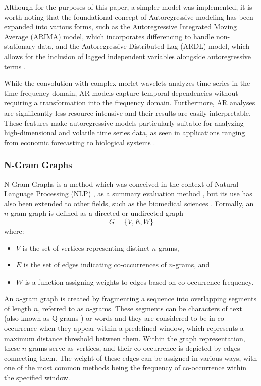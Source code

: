 \documentclass{article}
\begin{document}
Although for the purposes of this paper, a simpler model was implemented, it is worth noting that the foundational concept of Autoregressive modeling has been expanded into various forms, such as the Autoregressive Integrated Moving Average (ARIMA) model, which incorporates differencing to handle non-stationary data, and the Autoregressive Distributed Lag (ARDL) model, which allows for the inclusion of lagged independent variables alongside autoregressive terms \cite{agbenyega2022, natsiopoulos2022}.

While the convolution with complex morlet wavelets analyzes time-series in the time-frequency domain, AR models capture temporal dependencies without requiring a transformation into the frequency domain. Furthermore, AR analyses are significantly less resource-intensive and their results are easily interpretable. These features make autoregressive models particularly suitable for analyzing high-dimensional and volatile time series data, as seen in applications ranging from economic forecasting to biological systems \cite{regis2022}.

\subsubsection{N-Gram Graphs} \label{sec:graphs}

N-Gram Graphs is a method which was conceived in the context of Natural Language Processing (NLP) \cite{giannakopoulos2008, tsekouras2017}, as a summary evaluation method \cite{giannakopoulos2008summarization}, but its use has also been extended to other fields, such as the biomedical sciences \cite{kazantzidis2017, polychronopoulos2014}. Formally, an \( n \)-gram graph is defined as a directed or undirected graph 
\[
G = \{ V, E, W \}
\]
where:
\begin{itemize}
    \item \( V \) is the set of vertices representing distinct \( n \)-grams,
    \item \( E \) is the set of edges indicating co-occurrences of \( n \)-grams, and
    \item \( W \) is a function assigning weights to edges based on co-occurrence frequency.
\end{itemize}

An \( n \)-gram graph is created by fragmenting a sequence into overlapping segments of length \( n \), referred to as \( n \)-grams. These segments can be characters of text (also known as Q-grams \cite{ukkonen1992}) or words and they are considered to be in co-occurrence when they appear within a predefined window, which represents a maximum distance threshold between them. Within the graph representation, these \( n \)-grams serve as vertices, and their co-occurrence is depicted by edges connecting them. The weight of these edges can be assigned in various ways, with one of the most common methods being the frequency of co-occurrence within the specified window.
\end{document}
